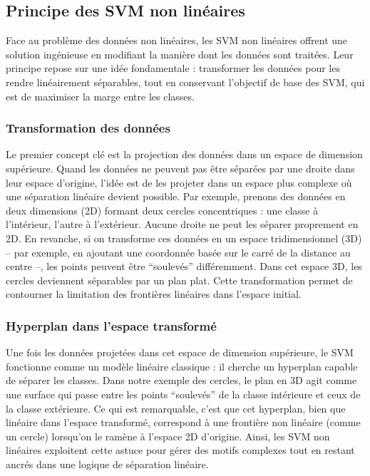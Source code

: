 \subsection{Principe des SVM non linéaires}

Face au problème des données non linéaires, les SVM non linéaires offrent une solution ingénieuse en modifiant la manière dont les données sont traitées. Leur principe repose sur une idée fondamentale : transformer les données pour les rendre linéairement séparables, tout en conservant l'objectif de base des SVM, qui est de maximiser la marge entre les classes.

\subsubsection{Transformation des données}

Le premier concept clé est la projection des données dans un espace de dimension supérieure. Quand les données ne peuvent pas être séparées par une droite dans leur espace d'origine, l'idée est de les projeter dans un espace plus complexe où une séparation linéaire devient possible. Par exemple, prenons des données en deux dimensions (2D) formant deux cercles concentriques : une classe à l'intérieur, l'autre à l'extérieur. Aucune droite ne peut les séparer proprement en 2D. En revanche, si on transforme ces données en un espace tridimensionnel (3D) -- par exemple, en ajoutant une coordonnée basée sur le carré de la distance au centre --, les points peuvent être ``soulevés'' différemment. Dans cet espace 3D, les cercles deviennent séparables par un plan plat. Cette transformation permet de contourner la limitation des frontières linéaires dans l'espace initial.

\subsubsection{Hyperplan dans l'espace transformé}

Une fois les données projetées dans cet espace de dimension supérieure, le SVM fonctionne comme un modèle linéaire classique : il cherche un hyperplan capable de séparer les classes. Dans notre exemple des cercles, le plan en 3D agit comme une surface qui passe entre les points ``soulevés'' de la classe intérieure et ceux de la classe extérieure. Ce qui est remarquable, c'est que cet hyperplan, bien que linéaire dans l'espace transformé, correspond à une frontière non linéaire (comme un cercle) lorsqu'on le ramène à l'espace 2D d'origine. Ainsi, les SVM non linéaires exploitent cette astuce pour gérer des motifs complexes tout en restant ancrés dans une logique de séparation linéaire.

